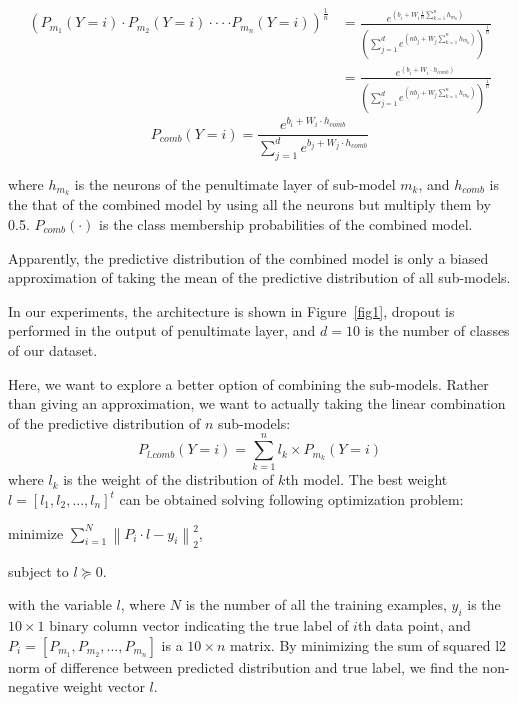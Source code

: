 \documentclass{article} %
\begin{document}
\begin{equation}
\begin{split}
(P_{m_{1}}(Y=i)\cdot P_{m_{2}}(Y=i)\cdot\cdot \cdot \cdot P_{m_{n}}(Y=i))^{\frac{1}{n}}&=\frac{e^{(b_{i}+W_{i}\frac{1}{n}\sum_{k=1}^{n}h_{m_{k}})}}{(\sum_{j=1}^{d}e^{(nb_{j}+W_{j}\sum_{k=1}^{n}h_{m_{k}})})^{\frac{1}{n}}}
 \\
           &= \frac{e^{(b_{i}+W_{i}\cdot h_{comb})}}{(\sum_{j=1}^{d}e^{(nb_{j}+W_{j}\sum_{k=1}^{n}h_{m_{k}})})^{\frac{1}{n}}}
\end{split}
\end{equation}
\begin{equation}
P_{comb}(Y=i)=\frac{e^{b_{i}+W_{i}\cdot h_{comb}}}{\sum_{j=1}^{d}e^{b_{j}+W_{j}\cdot h_{comb}}}
\end{equation}

where $h_{m_{k}}$ is the neurons of the penultimate layer of sub-model $m_{k}$, and $h_{comb}$ is the that of the combined model by using all the neurons but multiply them by 0.5. $P_{comb}(\cdot)$ is the class membership probabilities of the combined model. 
\par
Apparently, the predictive distribution of the combined model is only a biased approximation of taking the mean of the predictive distribution of all sub-models.
\par
In our experiments, the architecture is shown in Figure~\ref{fig1}, dropout is performed in the output of penultimate layer, and $d=10$ is the number of classes of our dataset.
\par
Here, we want to explore a better option of combining the sub-models. Rather than giving an approximation, we want to actually taking the linear combination of the predictive distribution of $n$ sub-models:
\begin{equation}
P_{l.comb}(Y=i) = \sum_{k=1}^{n}l_{k}\times P_{m_{k}}(Y=i)
\end{equation}
where $l_{k}$ is the weight of the distribution of $k$th model. The best weight $l=\left[ l_{1},l_{2}, ..., l_{n}\right]^{t}$ can be obtained solving following optimization problem:
\par
\setlength{\parindent}{3em}
minimize $\sum_{i=1}^{N}\left \| P_{i}\cdot l-y_{i} \right \|_{2}^{2}$,
\par
\setlength{\parindent}{3em}
subject to $l\succeq 0$.
\setlength{\parindent}{0pt}
\par
with the variable $l$, where $N$ is the number of all the training examples, $y_{i}$ is the $10 \times 1$ binary column vector indicating the true label of $i$th data point, and $P_{i} =\left [ P_{m_{1}},P_{m_{2}},...,P_{m_{n}} \right ] $ is a $10 \times n$ matrix. By minimizing the sum of squared l2 norm of difference between predicted distribution and true label, we find the non-negative weight vector $l$.
\end{document}
